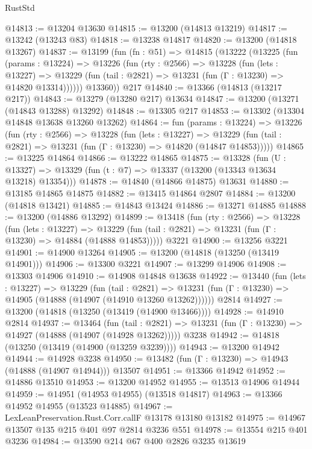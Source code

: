 \begin{lexlean}{RustStd}
\begin{coremodule}
@14813 := @13204 @13630
@14815 := @13200 (@14813 @13219)
@14817 := @13242 (@13243 @83)
@14818 := @13238 @14817
@14820 := @13200 (@14818 @13267)
@14837 := @13199
    (fun (fn : @51) =>
    @14815
      (@13222
        (@13225
          (fun (params : @13224) =>
          @13226
            (fun (rty : @2566) =>
            @13228
              (fun (lets : @13227) =>
              @13229 (fun (tail : @2821) => @13231 (fun (Γ : @13230) => @14820 @13314))))))
        @13360))
    @217
@14840 := @13366 (@14813 (@13217 @217))
@14843 := @13279 (@13280 @217) @13634
@14847 := @13200 (@13271 (@14843 @13288) @13292)
@14848 := @13305 @217
@14853 := @13302 (@13304 @14848 @13638 @13260 @13262)
@14864 := fun (params : @13224) =>
  @13226
    (fun (rty : @2566) =>
    @13228
      (fun (lets : @13227) =>
      @13229 (fun (tail : @2821) => @13231 (fun (Γ : @13230) => @14820 (@14847 @14853)))))
@14865 := @13225 @14864
@14866 := @13222 @14865
@14875 := @13328
    (fun (U : @13327) => @13329 (fun (t : @7) => @13337 (@13200 (@13343 @13634 @13218) @13354)))
@14878 := @14840 (@14866 @14875) @13631
@14880 := @13185 @14865 @14875
@14882 := @13415 @14864 @2807
@14884 := @13200 (@14818 @13421)
@14885 := @14843 @13424
@14886 := @13271 @14885
@14888 := @13200 (@14886 @13292)
@14899 := @13418
    (fun (rty : @2566) =>
    @13228
      (fun (lets : @13227) =>
      @13229 (fun (tail : @2821) => @13231 (fun (Γ : @13230) => @14884 (@14888 @14853)))))
    @3221
@14900 := @13256 @3221
@14901 := @14900 @13264
@14905 := @13200 (@14818 (@13250 (@13419 @14901)))
@14906 := @13300 @3221
@14907 := @13299 @14906
@14908 := @13303 @14906
@14910 := @14908 @14848 @13638
@14922 := @13440
    (fun (lets : @13227) =>
    @13229
      (fun (tail : @2821) =>
      @13231 (fun (Γ : @13230) => @14905 (@14888 (@14907 (@14910 @13260 @13262))))))
    @2814
@14927 := @13200 (@14818 (@13250 (@13419 (@14900 @13466))))
@14928 := @14910 @2814
@14937 := @13464
    (fun (tail : @2821) => @13231 (fun (Γ : @13230) => @14927 (@14888 (@14907 (@14928 @13262)))))
    @3238
@14942 := @14818 (@13250 (@13419 (@14900 (@13259 @3239))))
@14943 := @13200 @14942
@14944 := @14928 @3238
@14950 := @13482 (fun (Γ : @13230) => @14943 (@14888 (@14907 @14944))) @13507
@14951 := @13366 @14942
@14952 := @14886 @13510
@14953 := @13200 @14952
@14955 := @13513 @14906 @14944
@14959 := @14951 (@14953 @14955) (@13518 @14817)
@14963 := @13366 @14952 @14955 (@13523 @14885)
@14967 := LexLeanPreservation.Rust.Corr.callF @13178 @13180 @13182
@14975 := @14967 @13507 @135 @215 @401 @97 @2814 @3236 @551
@14978 := @13554 @215 @401 @3236
@14984 := @13590 @214 @67 @400 @2826 @3235 @13619

\end{coremodule}
\end{lexlean}
